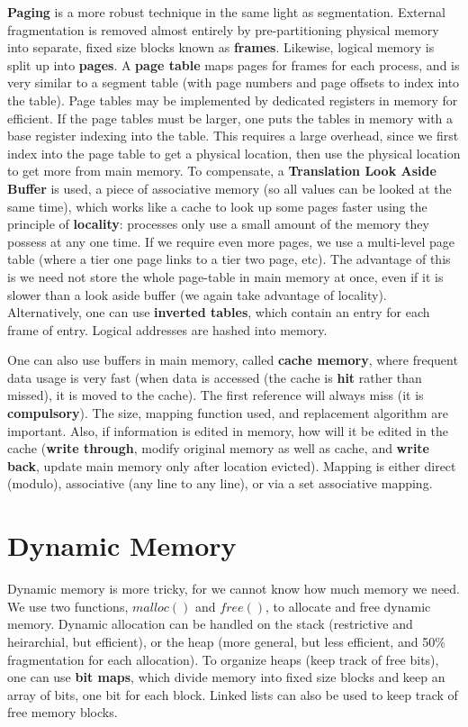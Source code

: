 {\bf Paging} is a more robust technique in the same light as segmentation. External fragmentation is removed almost entirely by pre-partitioning physical memory into separate, fixed size blocks known as {\bf frames}. Likewise, logical memory is split up into {\bf pages}. A {\bf page table} maps pages for frames for each process, and is very similar to a segment table (with page numbers and page offsets to index into the table). Page tables may be implemented by dedicated registers in memory for efficient. If the page tables must be larger, one puts the tables in memory with a base register indexing into the table. This requires a large overhead, since we first index into the page table to get a physical location, then use the physical location to get more from main memory. To compensate, a {\bf Translation Look Aside Buffer} is used, a piece of associative memory (so all values can be looked at the same time), which works like a cache to look up some pages faster using the principle of {\bf locality}: processes only use a small amount of the memory they possess at any one time. If we require even more pages, we use a multi-level page table (where a tier one page links to a tier two page, etc). The advantage of this is we need not store the whole page-table in main memory at once, even if it is slower than a look aside buffer (we again take advantage of locality). Alternatively, one can use {\bf inverted tables}, which contain an entry for each frame of entry. Logical addresses are hashed into memory.

One can also use buffers in main memory, called {\bf cache memory}, where frequent data usage is very fast (when data is accessed (the cache is {\bf hit} rather than missed), it is moved to the cache). The first reference will always miss (it is {\bf compulsory}). The size, mapping function used, and replacement algorithm are important. Also, if information is edited in memory, how will it be edited in the cache ({\bf write through}, modify original memory as well as cache, and {\bf write back}, update main memory only after location evicted). Mapping is either direct (modulo), associative (any line to any line), or via a set associative mapping.

\section{Dynamic Memory}

Dynamic memory is more tricky, for we cannot know how much memory we need. We use two functions, $malloc()$ and $free()$, to allocate and free dynamic memory. Dynamic allocation can be handled on the stack (restrictive and heirarchial, but efficient), or the heap (more general, but less efficient, and 50\% fragmentation for each allocation). To organize heaps (keep track of free bits), one can use {\bf bit maps}, which divide memory into fixed size blocks and keep an array of bits, one bit for each block. Linked lists can also be used to keep track of free memory blocks.

